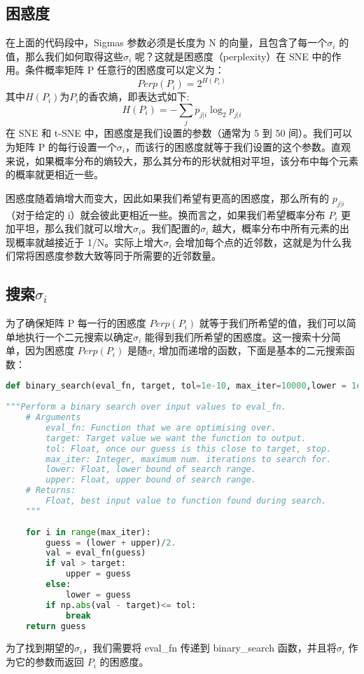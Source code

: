\subsection{困惑度}
在上面的代码段中，Sigmas 参数必须是长度为 N 的向量，且包含了每一个$\sigma_i$ 的值，那么我们如何取得这些$\sigma_i$ 呢？这就是困惑度（perplexity）在 SNE 中的作用。条件概率矩阵 P 任意行的困惑度可以定义为：
\begin{equation}\label{eq:sne6}
Perp(P_i)=2^{H(P_i)}
\end{equation}
其中$H(P_i)$为$P_i$的香农熵，即表达式如下:
\begin{equation}\label{eq:sne7}
H(P_i)=-\sum_{j}p_{j|i}\log_2p_{j|i}
\end{equation}
在 SNE 和 t-SNE 中，困惑度是我们设置的参数（通常为 5 到 50 间）。我们可以为矩阵 P 的每行设置一个$\sigma_i$，而该行的困惑度就等于我们设置的这个参数。直观来说，如果概率分布的熵较大，那么其分布的形状就相对平坦，该分布中每个元素的概率就更相近一些。

困惑度随着熵增大而变大，因此如果我们希望有更高的困惑度，那么所有的 $p_{j|i}$（对于给定的 i）就会彼此更相近一些。换而言之，如果我们希望概率分布 $P_i$ 更加平坦，那么我们就可以增大$\sigma_i$。我们配置的$\sigma_i$ 越大，概率分布中所有元素的出现概率就越接近于 1/N。实际上增大$\sigma_i$ 会增加每个点的近邻数，这就是为什么我们常将困惑度参数大致等同于所需要的近邻数量。
\subsection{搜索$\sigma_i$}
为了确保矩阵 P 每一行的困惑度 $Perp(P_i)$ 就等于我们所希望的值，我们可以简单地执行一个二元搜索以确定$\sigma_i$ 能得到我们所希望的困惑度。这一搜索十分简单，因为困惑度 $Perp(P_i)$ 是随$\sigma_i$ 增加而递增的函数，下面是基本的二元搜索函数：
\begin{lstlisting}[language=Python]
def binary_search(eval_fn, target, tol=1e-10, max_iter=10000,lower = 1e-20,upper=1000.):
    
"""Perform a binary search over input values to eval_fn.
    # Arguments
        eval_fn: Function that we are optimising over.
        target: Target value we want the function to output.
        tol: Float, once our guess is this close to target, stop.
        max_iter: Integer, maximum num. iterations to search for.
        lower: Float, lower bound of search range.
        upper: Float, upper bound of search range.
    # Returns:
        Float, best input value to function found during search.
    """
    
    for i in range(max_iter):
        guess = (lower + upper)/2.
        val = eval_fn(guess)        
        if val > target:
            upper = guess
        else:
            lower = guess 
        if np.abs(val - target)<= tol:            
            break    
    return guess 
\end{lstlisting}
为了找到期望的$\sigma_i$，我们需要将 eval\_fn 传递到 binary\_search 函数，并且将$\sigma_i$ 作为它的参数而返回 $P_i$ 的困惑度。


